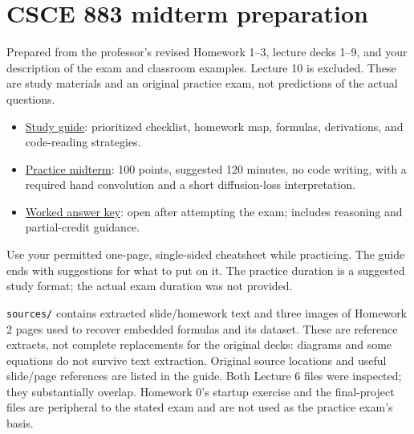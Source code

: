 \documentclass[11pt]{article}
\begin{document}
\section*{CSCE 883 midterm preparation}

Prepared from the professor's revised Homework 1–3, lecture decks 1–9, and your description of the exam and classroom examples. Lecture 10 is excluded. These are study materials and an original practice exam, not predictions of the actual questions.

\begin{itemize}
\item \href{\detokenize{Study_Guide.pdf}}{Study guide}: prioritized checklist, homework map, formulas, derivations, and code-reading strategies.
\item \href{\detokenize{Practice_Midterm.pdf}}{Practice midterm}: 100 points, suggested 120 minutes, no code writing, with a required hand convolution and a short diffusion-loss interpretation.
\item \href{\detokenize{Practice_Midterm_Answers.pdf}}{Worked answer key}: open after attempting the exam; includes reasoning and partial-credit guidance.
\end{itemize}

Use your permitted one-page, single-sided cheatsheet while practicing. The guide ends with suggestions for what to put on it. The practice duration is a suggested study format; the actual exam duration was not provided.

\texttt{sources/\allowbreak{}} contains extracted slide/\allowbreak{}homework text and three images of Homework 2 pages used to recover embedded formulas and its dataset. These are reference extracts, not complete replacements for the original decks: diagrams and some equations do not survive text extraction. Original source locations and useful slide/\allowbreak{}page references are listed in the guide. Both Lecture 6 files were inspected; they substantially overlap. Homework 0's startup exercise and the final-project files are peripheral to the stated exam and are not used as the practice exam's basis.
\end{document}
